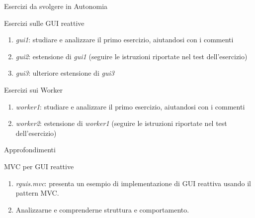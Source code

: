 \documentclass[presentation]{beamer}
\begin{document}
\begin{frame}{Esercizi da svolgere in Autonomia}
\begin{block}{Esercizi sulle GUI reattive}
\begin{enumerate}
\item \emph{gui1}: studiare e analizzare il primo esercizio, aiutandosi con i commenti
\item \emph{gui2}: estensione di \emph{gui1} (seguire le istruzioni riportate nel test dell'esercizio)
\item \emph{gui3}: ulteriore estensione di \emph{gui3}
\end{enumerate}
\end{block}

\begin{block}{Esercizi sui Worker}
\begin{enumerate}
\item  \emph{worker1}: studiare e analizzare il primo esercizio, aiutandosi con i commenti
\item \emph{worker2}: estensione di \emph{worker1} (seguire le istruzioni riportate nel test dell'esercizio)
\end{enumerate}
\end{block}
\end{frame}

\begin{frame}{Approfondimenti}
\begin{block}{MVC per GUI reattive}
\begin{enumerate}
\item \emph{rguis.mvc}: presenta un esempio di implementazione di GUI reattiva usando il pattern MVC. 
\item Analizzarne e comprenderne struttura e comportamento.
\end{enumerate}
\end{block}

\end{frame}
\end{document}
